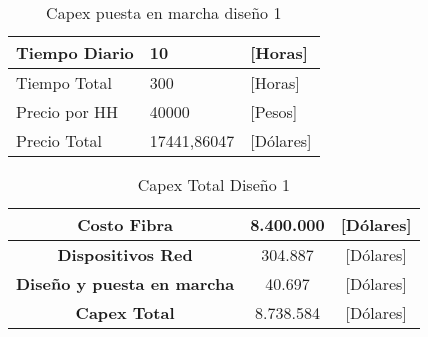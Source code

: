 \begin{table}[H]
\begin{tabular}{lll}
\multicolumn{1}{|l|}{Tiempo Diario} & \multicolumn{1}{l|}{10} & \multicolumn{1}{l|}{{[}Horas{]}} \\ \hline
\multicolumn{1}{|l|}{Tiempo Total} & \multicolumn{1}{l|}{300} & \multicolumn{1}{l|}{{[}Horas{]}} \\ \hline
\multicolumn{1}{|l|}{Precio por HH} & \multicolumn{1}{l|}{40000} & \multicolumn{1}{l|}{{[}Pesos{]}} \\ \hline
\multicolumn{1}{|l|}{Precio Total} & \multicolumn{1}{l|}{17441,86047} & \multicolumn{1}{l|}{{[}Dólares{]}} \\ \hline
\end{tabular}
\caption{Capex puesta en marcha diseño 1}
\label{tab:my-table}
\end{table}


\begin{table}[H]
\begin{tabular}{|c|c|c|}
\hline
\textbf{Costo Fibra} & 8.400.000 & [Dólares] \\ \hline
\textbf{Dispositivos Red} & 304.887 & [Dólares] \\ \hline
\textbf{Diseño y puesta en marcha} & 40.697 & [Dólares] \\ \hline
\textbf{Capex Total} & 8.738.584  & [Dólares]\\ \hline
\end{tabular}
\caption{Capex Total Diseño 1}
\label{tab:my-table}
\end{table}